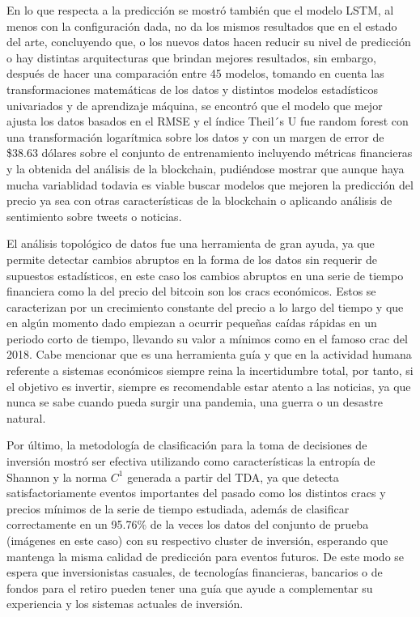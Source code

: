 En lo que respecta a la predicción se mostró también que el modelo LSTM, al menos con la configuración dada, no da los mismos resultados que en el estado del arte, concluyendo que, o los nuevos datos hacen reducir su nivel de predicción o hay distintas arquitecturas que brindan mejores resultados, sin embargo, después de hacer una comparación entre 45 modelos, tomando en cuenta las transformaciones matemáticas de los datos y distintos modelos estadísticos univariados y de aprendizaje máquina, se encontró que el modelo que mejor ajusta los datos basados en el RMSE y el índice Theil´s U fue random forest con una transformación logarítmica sobre los datos y con un margen de error de \$38.63 dólares sobre el conjunto de entrenamiento incluyendo métricas financieras y la obtenida del análisis de la blockchain, pudiéndose mostrar que aunque haya mucha variablidad todavia es viable buscar modelos que mejoren la predicción del precio ya sea con otras características de la blockchain o aplicando análisis de sentimiento sobre tweets o noticias.

El análisis topológico de datos fue una herramienta de gran ayuda, ya que permite detectar cambios abruptos en la forma de los datos sin requerir de supuestos estadísticos, en este caso los cambios abruptos en una serie de tiempo financiera como la del precio del bitcoin son los cracs económicos. Estos se caracterizan por un crecimiento constante del precio a lo largo del tiempo y que en algún momento dado empiezan a ocurrir pequeñas caídas rápidas en un periodo corto de tiempo, llevando su valor a mínimos como en el famoso crac del 2018. Cabe mencionar que es una herramienta guía y que en la actividad humana referente a sistemas económicos siempre reina la incertidumbre total, por tanto, si el objetivo es invertir, siempre es recomendable estar atento a las noticias, ya que nunca se sabe cuando pueda surgir una pandemia, una guerra o un desastre natural.

Por último, la metodología de clasificación para la toma de decisiones de inversión mostró ser efectiva utilizando como características la entropía de Shannon y la norma $C^1$ generada a partir del TDA, ya que detecta satisfactoriamente eventos importantes del pasado como los distintos cracs y precios mínimos de la serie de tiempo estudiada, además de clasificar correctamente en un 95.76\% de la veces los datos del conjunto de prueba (imágenes en este caso) con su respectivo cluster de inversión, esperando que mantenga la misma calidad de predicción para eventos futuros. De este modo se espera que inversionistas casuales, de tecnologías financieras, bancarios o de fondos para el retiro pueden tener una guía que ayude a complementar su experiencia y los sistemas actuales de inversión.

